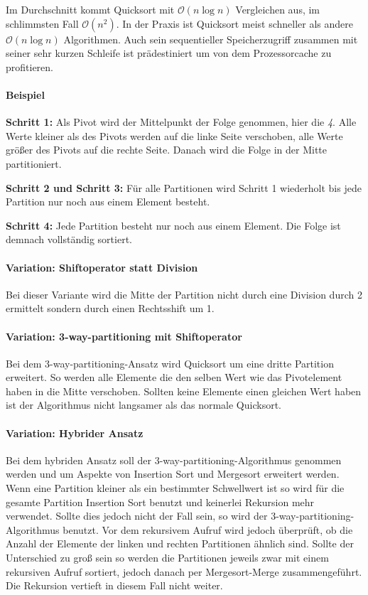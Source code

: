 \documentclass[12pt, a4paper, titlepage, hidelinks]{scrreprt}
\begin{document}
Im Durchschnitt kommt Quicksort mit $\mathcal{O}(n\log{}n)$ Vergleichen aus, im schlimmsten Fall $\mathcal{O}(n^2)$. In der Praxis ist Quicksort meist schneller als andere $\mathcal{O}(n\log{}n)$ Algorithmen. Auch sein sequentieller Speicherzugriff zusammen mit seiner sehr kurzen Schleife ist prädestiniert um von dem Prozessorcache zu profitieren.

\paragraph{Beispiel} 
\textbf{Schritt 1:} Als Pivot wird der Mittelpunkt der Folge genommen, hier die \textit{4}. Alle Werte kleiner als des Pivots werden auf die linke Seite verschoben, alle Werte größer des Pivots auf die rechte Seite. Danach wird die Folge in der Mitte partitioniert.

\textbf{Schritt 2 und Schritt 3:} Für alle Partitionen wird Schritt 1 wiederholt bis jede Partition nur noch aus einem Element besteht.

\textbf{Schritt 4:} Jede Partition besteht nur noch aus einem Element. Die Folge ist demnach vollständig sortiert.

\paragraph{Variation: Shiftoperator statt Division} Bei dieser Variante wird die Mitte der Partition nicht durch eine Division durch 2 ermittelt sondern durch einen Rechtsshift um 1.

\paragraph{Variation: 3-way-partitioning mit Shiftoperator} Bei dem 3-way-partitioning-Ansatz wird Quicksort um eine dritte Partition erweitert. So werden alle Elemente die den selben Wert wie das Pivotelement haben in die Mitte verschoben. Sollten keine Elemente einen gleichen Wert haben ist der Algorithmus nicht langsamer als das normale Quicksort.

\paragraph{Variation: Hybrider Ansatz} Bei dem hybriden Ansatz soll der 3-way-partitioning-Algorithmus genommen werden und um Aspekte von Insertion Sort und Mergesort erweitert werden. Wenn eine Partition kleiner als ein bestimmter Schwellwert ist so wird für die gesamte Partition Insertion Sort benutzt und keinerlei Rekursion mehr verwendet. Sollte dies jedoch nicht der Fall sein, so wird der 3-way-partitioning-Algorithmus benutzt. Vor dem rekursivem Aufruf wird jedoch überprüft, ob die Anzahl der Elemente der linken und rechten Partitionen ähnlich sind. Sollte der Unterschied zu groß sein so werden die Partitionen jeweils zwar mit einem rekursiven Aufruf sortiert, jedoch danach per Mergesort-Merge zusammengeführt. Die Rekursion vertieft in diesem Fall nicht weiter.
\end{document}
